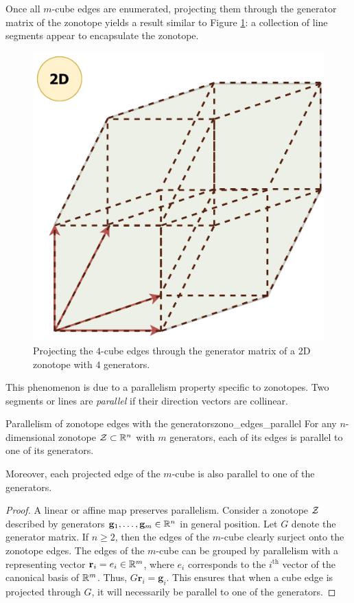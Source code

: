 Once all $m$-cube edges are enumerated, projecting them through the generator matrix of the zonotope yields a result similar to Figure \ref{fig:from_cube_edges_to_zonotope_edges}: a collection of line segments appear to encapsulate the zonotope.

\begin{figure}[!htb]
  \captionsetup{justification=centering}
  \centering
  \includegraphics[trim={0 0 0 0},clip, width=0.3\linewidth]{img/chapter_2/zonotope_after_cube_duplication.pdf}
  \caption{Projecting the $4$-cube edges through the generator matrix of a 2D zonotope with $4$ generators.}
  \label{fig:from_cube_edges_to_zonotope_edges}
\end{figure}

This phenomenon is due to a parallelism property specific to zonotopes. Two segments or lines are \emph{parallel} if their direction vectors are collinear.

\begin{lemmabox}{Parallelism of zonotope edges with the generators}{zono_edges_parallel}
  For any $n$-dimensional zonotope $\mathcal{Z} \subset \mathbb{R}^n$ with $m$ generators, each of its edges is parallel to one of its generators.

  Moreover, each projected edge of the $m$-cube is also parallel to one of the generators.
\end{lemmabox}
\begin{proof}
A linear or affine map preserves parallelism. 
Consider a zonotope $\mathcal{Z}$ described by generators $\mathbf{g}_1,\dots,\mathbf{g}_m \in \mathbb{R}^n$ in general position. Let $G$ denote the generator matrix. If $n\geq 2$, then the edges of the $m$-cube clearly surject onto the zonotope edges.
The edges of the $m$-cube can be grouped by parallelism with a representing vector $\mathbf{r}_i = e_i \in \mathbb{R}^m$, where $e_i$ corresponds to the $i^{\text{th}}$ vector of the canonical basis of $\mathbb{R}^m$. Thus, $G\mathbf{r}_i = \mathbf{g}_i$. This ensures that when a cube edge is projected through $G$, it will necessarily be parallel to one of the generators.
\end{proof}

